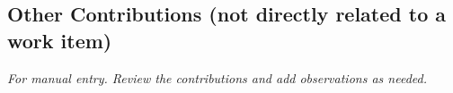 \subsection{Other Contributions (not directly related to a work item)}

\textit{For manual entry. Review the contributions and add observations as needed.}
